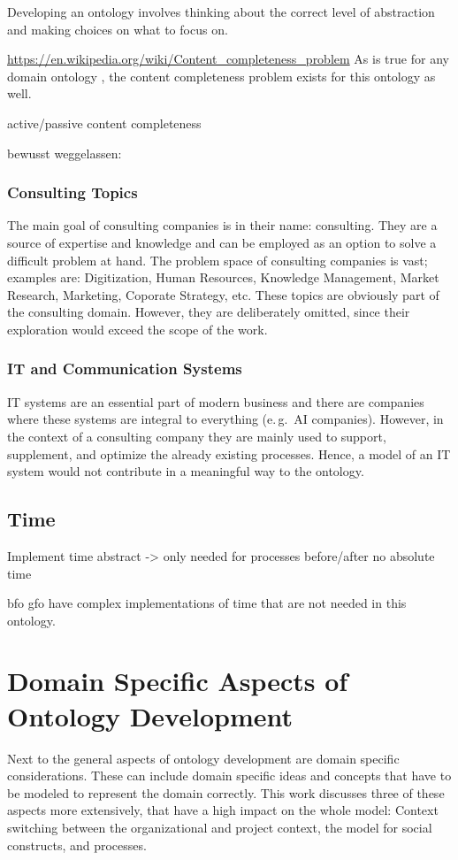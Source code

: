 \documentclass[a4paper, DIV=13, BCOR=0cm]{scrbook}
\newcommand{\eg}{e.\,g.\ }
\begin{document}
Developing an ontology involves thinking about the correct level of abstraction and making choices on what to focus on. 

\url{https://en.wikipedia.org/wiki/Content_completeness_problem}
As is true for any domain ontology \cite{CN}, the content completeness problem exists for this ontology as well.

active/passive content completeness

bewusst weggelassen:
\subsubsection{Consulting Topics}
The main goal of consulting companies is in their name: consulting. They are a source of expertise and knowledge and can be employed as an option to solve a difficult problem at hand. The problem space of consulting companies is vast; examples are: Digitization, Human Resources, Knowledge Management, Market Research, Marketing, Coporate Strategy, etc. These topics are obviously part of the consulting domain. However, they are deliberately omitted, since their exploration would exceed the scope of the work.

\subsubsection{IT and Communication Systems}
IT systems are an essential part of modern business and there are companies where these systems are integral to everything (\eg AI companies). However, in the context of a consulting company they are mainly used to support, supplement, and optimize the already existing processes. Hence, a model of an IT system would not contribute in a meaningful way to the ontology.

\subsection{Time}
\label{time}
Implement time abstract -> only needed for processes before/after
no absolute time

\gls{bfo} \gls{gfo} have complex implementations of time that are not needed in this ontology.

\section{Domain Specific Aspects of Ontology Development }
\label{domain-aspects}
Next to the general aspects of ontology development are domain specific considerations. These can include domain specific ideas and concepts that have to be modeled to represent the domain correctly. This work discusses three of these aspects more extensively, that have a high impact on the whole model: Context switching between the organizational and project context, the model for social constructs, and processes.
\end{document}
